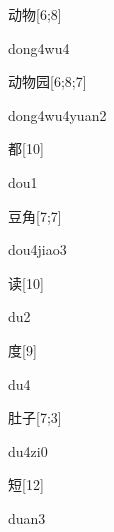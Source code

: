 \begin{verbete}[dong4wu4]{动物}[6;8]
\begin{pronuncia}{dong4wu4}
\end{pronuncia}
\end{verbete}

\begin{verbete}{动物园}[6;8;7]
\begin{pronuncia}{dong4wu4yuan2}
\end{pronuncia}
\end{verbete}

\begin{verbete}[dou1]{都}[10]
\begin{pronuncia}{dou1}
\end{pronuncia}
\end{verbete}

\begin{verbete}{豆角}[7;7]
\begin{pronuncia}{dou4jiao3}
\end{pronuncia}
\end{verbete}

\begin{verbete}[du2]{读}[10]
\begin{pronuncia}{du2}
\end{pronuncia}
\end{verbete}

\begin{verbete}[du4]{度}[9]
\begin{pronuncia}{du4}
\end{pronuncia}
\end{verbete}

\begin{verbete}[du4zi0]{肚子}[7;3]
\begin{pronuncia}{du4zi0}
\end{pronuncia}
\end{verbete}

\begin{verbete}[duan3]{短}[12]
\begin{pronuncia}{duan3}
\end{pronuncia}
\end{verbete}

